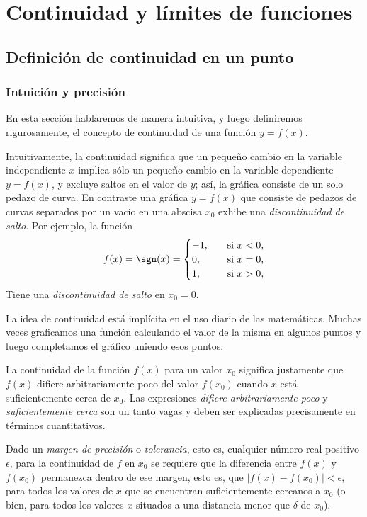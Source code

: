 \chapter{Continuidad y límites de funciones}

\section{Definición de continuidad en un punto}\label{S:continuidad}

\subsection*{Intuición y precisión}

En esta sección hablaremos de manera intuitiva, y luego definiremos rigurosamente, el concepto de continuidad de una función $y=f(x)$.

Intuitivamente, la continuidad significa que un pequeño cambio en la variable independiente $x$ implica sólo un pequeño cambio en la variable dependiente $y=f(x)$, y excluye saltos en el valor de $y$; así, la gráfica consiste de un solo pedazo de curva. En contraste una gráfica $y=f(x)$ que consiste de pedazos de curvas separados por un vacío en una abscisa $x_0$ exhibe una \emph{discontinuidad de salto}. Por ejemplo, la función 
\begin{equation}\label{eq:signo}
f(x) = \sgn(x) = \begin{cases}
    -1, \quad &\text{si $x<0$},\\
    0, \quad &\text{si $x=0$},\\
    1, \quad &\text{si $x>0$},
\end{cases}
\end{equation}
Tiene una \emph{discontinuidad de salto} en $x_0 = 0$.

La idea de continuidad está implícita en el uso diario de las matemáticas. Muchas veces graficamos una función calculando el valor de la misma en algunos puntos y luego completamos el gráfico uniendo esos puntos.

La continuidad de la función $f(x)$ para un valor $x_0$ significa justamente que $f(x)$ difiere arbitrariamente poco del valor $f(x_0)$ cuando $x$ está suficientemente cerca de $x_0$. 
Las expresiones \emph{difiere arbitrariamente poco} y \emph{suficientemente cerca} son un tanto vagas y deben ser explicadas precisamente en términos cuantitativos.

Dado un \emph{margen de precisión} o \emph{tolerancia}, esto es, cualquier número real positivo $\epsilon$, para la continuidad de $f$ en $x_0$ se requiere que la diferencia entre $f(x)$ y $f(x_0)$ permanezca dentro de ese margen, esto es, que $|f(x)-f(x_0)|<\epsilon$, para todos los valores de $x$ que se encuentran suficientemente cercanos a $x_0$ (o bien, para todos los valores $x$ situados a una distancia menor que $\delta$ de $x_0$).

